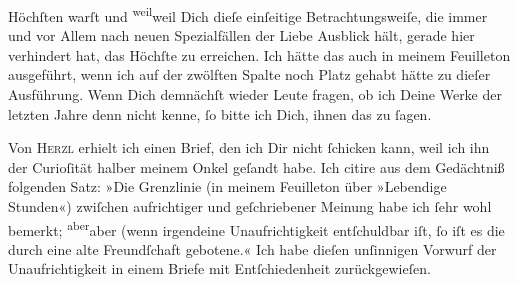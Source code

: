                Höchſten warſt und \substVorne{}\textsuperscript{weil}\substDazwischen{}weil\substHinten{} Dich dieſe einſeitige Betrachtungsweiſe, die immer und {\pb}vor Allem nach 
               neuen Spezialfällen der Liebe Ausblick hält, gerade hier verhindert hat, das Höchſte
               zu erreichen. Ich hätte das auch in meinem Feuilleton ausgeführt, wenn ich auf der zwölften Spalte
               noch Platz gehabt hätte zu dieſer Ausführung. Wenn Dich demnächſt wieder Leute
               fragen, ob ich Deine Werke der letzten Jahre denn nicht kenne,{ }ſo bitte ich Dich,
               ihnen das zu{ }ſagen.\pend
           
\pstart
           Von \textsc{Herzl} erhielt ich einen Brief, den ich Dir nicht{ }ſchicken kann, weil ich ihn der
               Curioſität halber meinem Onkel geſandt habe. Ich citire aus dem Gedächtniß folgenden Satz: »Die
               Grenzlinie (in meinem Feuilleton über »Lebendige Stunden«)
               zwiſchen aufrichtiger und geſchriebener Meinung {\pb}habe ich{ }ſehr wohl bemerkt; \substVorne{}\textsuperscript{aber}\substDazwischen{}aber\substHinten{} (wenn irgendeine Unaufrichtigkeit entſchuldbar iſt,{ }ſo iſt es die durch eine
               alte Freundſchaft gebotene.« Ich habe dieſen unſinnigen Vorwurf der Unaufrichtigkeit
                  \introOben{}in einem
                  Briefe\introOben{}
               mit Entſchiedenheit zurückgewieſen.\pend
           
